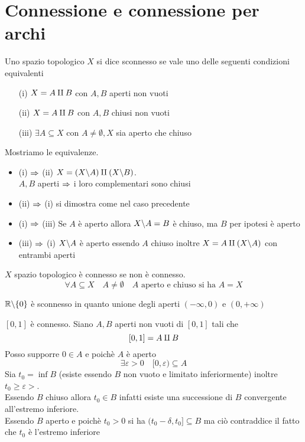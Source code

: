 \section{Connessione e connessione per archi}
\begin{defn}[Sconnessione]\bianco
Uno spazio topologico $X$ si dice sconnesso se vale uno delle seguenti condizioni equivalenti
\begin{enumerate}
\item[(i)] $X= A \amalg B$ con $A,B$ aperti non vuoti
\item[(ii)] $X= A \amalg B$ con $A,B$ chiusi non vuoti
\item[(iii)] $\exists A \subseteq X$ con $A\neq \emptyset, X $ sia aperto che chiuso
\end{enumerate}
\begin{oss}Mostriamo le equivalenze.
\begin{itemize}
\item (i) $\Rightarrow$ (ii)  $X = (X\backslash A) \amalg (X \backslash B) $.\\
 $A,B$ aperti $\Rightarrow$ i loro complementari sono chiusi
 \item (ii) $\Rightarrow$ (i) si dimostra come nel caso precedente
 \item (i) $\Rightarrow$ (iii) Se $A$ \`e aperto allora $X\backslash A =B$ \`e chiuso, ma $B$ per ipotesi \`e aperto 
 \item (iii) $\Rightarrow$ (i)  $X\backslash A $ \`e aperto essendo $A$ chiuso inoltre $X= A \amalg (X\backslash A)$ con entrambi aperti
\end{itemize} 
\end{oss}
\end{defn}
\begin{defn}[Connesso]\bianco
$X$ spazio topologico \`e connesso se non \`e connesso.\\
$$ \forall A \subseteq X \quad A \neq \emptyset \quad A \text{ aperto e chiuso si ha } A = X $$
\end{defn}
\begin{ese}$\mathbb{R}\backslash \{ 0 \}$ \`e sconnesso in quanto unione degli aperti $(-\infty, 0)$ e $ (0, + \infty)$
\end{ese}
\begin{thm}$[0,1]$ \`e connesso.
\proof Siano $A,B$ aperti non vuoti di $[0,1]$ tali che 
$$ [0,1]= A \amalg B $$ 
Posso supporre $0\in A$ e poich\`e $A$ \`e aperto 
$$ \exists \varepsilon>0 \quad [0,\varepsilon ) \subseteq A $$
Sia $t_0 = \inf B$ (esiste essendo $B$ non vuoto e limitato inferiormente) inoltre $t_0\geq \varepsilon >$.\\
Essendo $B$ chiuso allora $t_0\in B$ infatti esiste una successione di $B$ convergente all'estremo inferiore.\\
Essendo $B$ aperto e poich\`e $t_0>0$ si ha $(t_0-\delta , t_0]\subseteq B$ ma ci\`o contraddice il fatto che $t_0$ \`e l'estremo inferiore
\end{thm}
